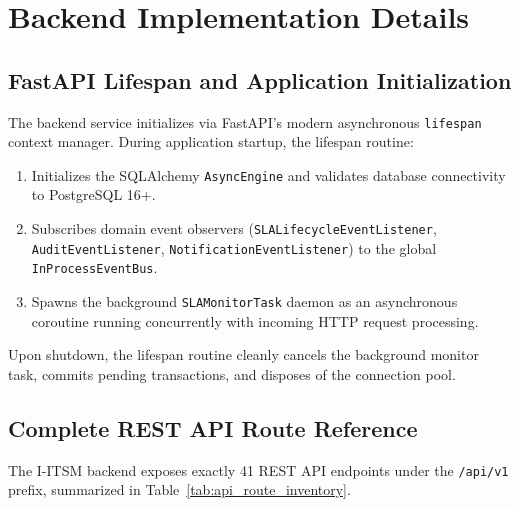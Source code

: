 \documentclass[11pt,a4paper,oneside]{report}
\begin{document}
\chapter{Backend Implementation Details}
\label{ch:backend}

\section{FastAPI Lifespan and Application Initialization}
\label{sec:backend_lifespan}
The backend service initializes via FastAPI's modern asynchronous \texttt{lifespan} context manager. During application startup, the lifespan routine:
\begin{enumerate}
    \item Initializes the SQLAlchemy \texttt{AsyncEngine} and validates database connectivity to PostgreSQL 16+.
    \item Subscribes domain event observers (\texttt{SLALifecycleEventListener}, \texttt{AuditEventListener}, \texttt{NotificationEventListener}) to the global \texttt{InProcessEventBus}.
    \item Spawns the background \texttt{SLAMonitorTask} daemon as an asynchronous coroutine running concurrently with incoming HTTP request processing.
\end{enumerate}

Upon shutdown, the lifespan routine cleanly cancels the background monitor task, commits pending transactions, and disposes of the connection pool.

\section{Complete REST API Route Reference}
\label{sec:backend_routes}
The I-ITSM backend exposes exactly 41 REST API endpoints under the \texttt{/api/v1} prefix, summarized in Table~\ref{tab:api_route_inventory}.
\end{document}
